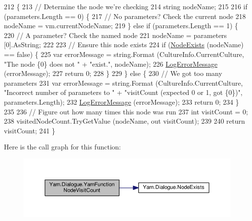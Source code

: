 \begin{DoxyCode}
212         \{
213             \textcolor{comment}{// Determine the node we're checking}
214             \textcolor{keywordtype}{string} nodeName;
215 
216             \textcolor{keywordflow}{if} (parameters.Length == 0) \{
217                 \textcolor{comment}{// No parameters? Check the current node}
218                 nodeName = vm.currentNodeName;
219             \} \textcolor{keywordflow}{else} \textcolor{keywordflow}{if} (parameters.Length == 1) \{
220                 \textcolor{comment}{// A parameter? Check the named node}
221                 nodeName = parameters [0].AsString;
222 
223                 \textcolor{comment}{// Ensure this node exists}
224                 \textcolor{keywordflow}{if} (\hyperlink{a00088_a93bb76a1f9a4058f225ff4cee97483c6}{NodeExists} (nodeName) == \textcolor{keyword}{false}) \{
225                     var errorMessage = string.Format (CultureInfo.CurrentCulture, \textcolor{stringliteral}{"The node \{0\} does not "} 
      + \textcolor{stringliteral}{"exist."}, nodeName);
226                     \hyperlink{a00088_a9801e83dd044d6498fdf6ebcc6bec5ac}{LogErrorMessage} (errorMessage);
227                     \textcolor{keywordflow}{return} 0;
228                 \}
229             \} \textcolor{keywordflow}{else} \{
230                 \textcolor{comment}{// We got too many parameters}
231                 var errorMessage = string.Format (CultureInfo.CurrentCulture, \textcolor{stringliteral}{"Incorrect number of
       parameters to "} + \textcolor{stringliteral}{"visitCount (expected 0 or 1, got \{0\})"}, parameters.Length);
232                 \hyperlink{a00088_a9801e83dd044d6498fdf6ebcc6bec5ac}{LogErrorMessage} (errorMessage);
233                 \textcolor{keywordflow}{return} 0;
234             \}
235 
236             \textcolor{comment}{// Figure out how many times this node was run}
237             \textcolor{keywordtype}{int} visitCount = 0;
238             visitedNodeCount.TryGetValue (nodeName, out visitCount);
239 
240             \textcolor{keywordflow}{return} visitCount;
241         \}
\end{DoxyCode}


Here is the call graph for this function\-:
\nopagebreak
\begin{figure}[H]
\begin{center}
\leavevmode
\includegraphics[width=350pt]{a00088_a10c9f22d3f55e74f091cd6069c431094_cgraph}
\end{center}
\end{figure}




